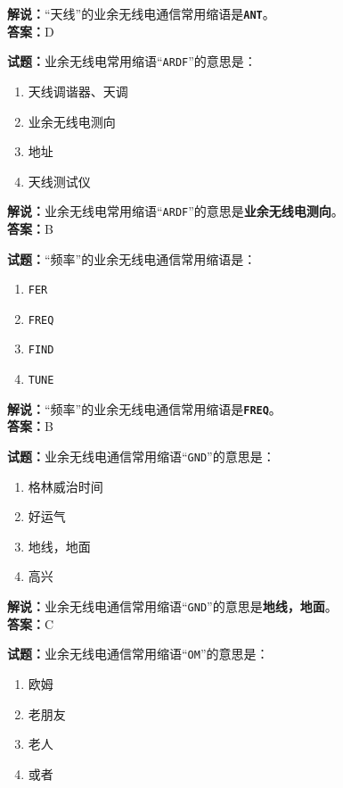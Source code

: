 \documentclass{ctexbook}
\begin{document}
\noindent\textbf{解说：}“天线”的业余无线电通信常用缩语是\texttt{\textbf{ANT}}。\\\noindent\textbf{答案：}D


\bigskip


\noindent\textbf{试题：}业余无线电常用缩语“\texttt{ARDF}”的意思是：

\begin{enumerate}[leftmargin=3em]
	\item 天线调谐器、天调
	\item 业余无线电测向
	\item 地址
	\item 天线测试仪
\end{enumerate}

\noindent\textbf{解说：}业余无线电常用缩语“\texttt{ARDF}”的意思是\textbf{业余无线电测向}。\\\noindent\textbf{答案：}B


\bigskip


\noindent\textbf{试题：}“频率”的业余无线电通信常用缩语是：
\begin{enumerate}[leftmargin=3em]
	\item \texttt{FER}
	\item \texttt{FREQ}
	\item \texttt{FIND}
	\item \texttt{TUNE}
\end{enumerate}

\noindent\textbf{解说：}“频率”的业余无线电通信常用缩语是\texttt{\textbf{FREQ}}。\\\noindent\textbf{答案：}B

\bigskip


\noindent\textbf{试题：}业余无线电通信常用缩语“\texttt{GND}”的意思是：

\begin{enumerate}[leftmargin=3em]
	\item 格林威治时间
	\item 好运气
	\item 地线，地面
	\item 高兴
\end{enumerate}

\noindent\textbf{解说：}业余无线电通信常用缩语“\texttt{GND}”的意思是\textbf{地线，地面}。\\\noindent\textbf{答案：}C


\bigskip


\noindent\textbf{试题：}业余无线电通信常用缩语“\texttt{OM}”的意思是：

\begin{enumerate}[leftmargin=3em]
	\item 欧姆
	\item 老朋友
	\item 老人
	\item 或者
\end{enumerate}
\end{document}
